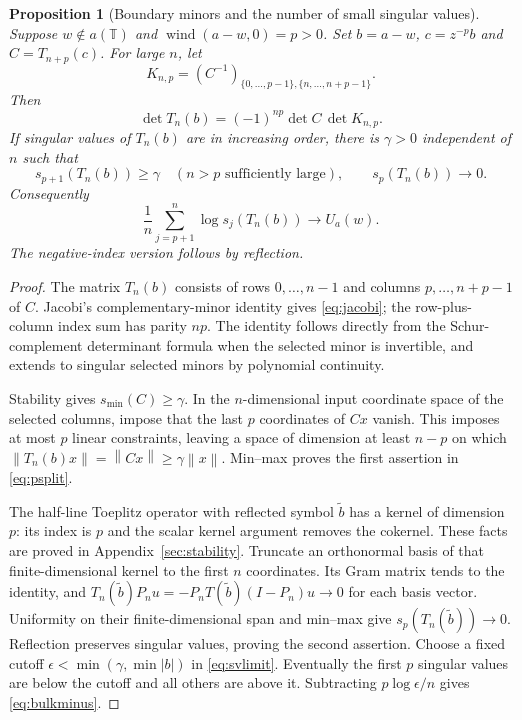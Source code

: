 \documentclass[11pt]{article}
\newtheorem{proposition}[theorem]{Proposition}
\theoremstyle{definition}
\newcommand{\T}{\mathbb T}
\newcommand{\norm}[1]{\left\lVert #1\right\rVert}
\newcommand{\wind}{\operatorname{wind}}
\begin{document}
\begin{proposition}[Boundary minors and the number of small singular values]\label{prop:generalindex}
Suppose $w\notin a(\T)$ and $\wind(a-w,0)=p>0$. Set $b=a-w$, $c=z^{-p}b$ and $C=T_{n+p}(c)$. For large $n$, let
\[
 K_{n,p}=(C^{-1})_{\{0,\ldots,p-1\},\{n,\ldots,n+p-1\}}.
\]
Then
\begin{equation}
 \det T_n(b)=(-1)^{np}\det C\,\det K_{n,p}.
 \label{eq:jacobi}
\end{equation}
If singular values of $T_n(b)$ are in increasing order, there is $\gamma>0$ independent of $n$ such that
\begin{equation}
 s_{p+1}(T_n(b))\ge\gamma\quad(n>p\text{ sufficiently large}),\qquad
 s_p(T_n(b))\longrightarrow0.
 \label{eq:psplit}
\end{equation}
Consequently
\begin{equation}
 \frac1n\sum_{j=p+1}^n\log s_j(T_n(b))\longrightarrow U_a(w).
 \label{eq:bulkminus}
\end{equation}
The negative-index version follows by reflection.
\end{proposition}
\begin{proof}
The matrix $T_n(b)$ consists of rows $0,\ldots,n-1$ and columns $p,\ldots,n+p-1$ of $C$. Jacobi's complementary-minor identity gives \eqref{eq:jacobi}; the row-plus-column index sum has parity $np$. The identity follows directly from the Schur-complement determinant formula when the selected minor is invertible, and extends to singular selected minors by polynomial continuity.

Stability gives $s_{\min}(C)\ge\gamma$. In the $n$-dimensional input coordinate space of the selected columns, impose that the last $p$ coordinates of $Cx$ vanish. This imposes at most $p$ linear constraints, leaving a space of dimension at least $n-p$ on which $\norm{T_n(b)x}=\norm{Cx}\ge\gamma\norm x$. Min--max proves the first assertion in \eqref{eq:psplit}.

The half-line Toeplitz operator with reflected symbol $\widetilde b$ has a kernel of dimension $p$: its index is $p$ and the scalar kernel argument removes the cokernel. These facts are proved in Appendix~\ref{sec:stability}. Truncate an orthonormal basis of that finite-dimensional kernel to the first $n$ coordinates. Its Gram matrix tends to the identity, and
$T_n(\widetilde b)P_nu=-P_nT(\widetilde b)(I-P_n)u\to0$
for each basis vector. Uniformity on their finite-dimensional span and min--max give $s_p(T_n(\widetilde b))\to0$. Reflection preserves singular values, proving the second assertion. Choose a fixed cutoff $\epsilon<\min(\gamma,\min|b|)$ in \eqref{eq:svlimit}. Eventually the first $p$ singular values are below the cutoff and all others are above it. Subtracting $p\log\epsilon/n$ gives \eqref{eq:bulkminus}.
\end{proof}
\end{document}
